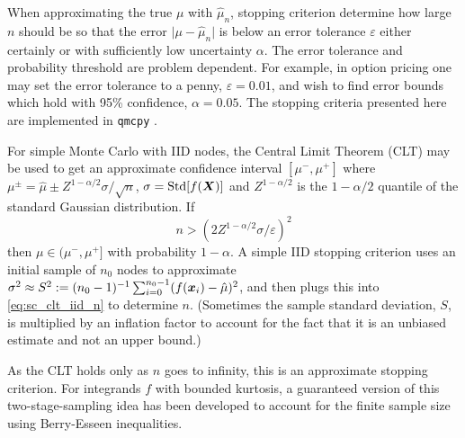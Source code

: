 \documentclass{svproc}
\begin{document}
When approximating the true $\mu$ with $\hat{\mu}_n$, stopping criterion determine how large $n$ should be so that the error $\lvert \mu - \hat{\mu}_n \rvert$ is below an error tolerance $\varepsilon$ either certainly or with sufficiently low uncertainty $\alpha$. The error tolerance and probability threshold are problem dependent. For example, in option pricing one may set the error tolerance to a penny, $\varepsilon=0.01$, and wish to find error bounds which hold with 95\% confidence, $\alpha=0.05$. The stopping criteria presented here are implemented in \texttt{qmcpy} \cite{QMCPy2020a}.

For simple Monte Carlo with IID nodes, the Central Limit Theorem (CLT) may be used to get an approximate confidence interval $[\mu^-,\mu^+]$ where $\mu^\pm = \hat{\mu} \pm Z^{1-\alpha/2} \sigma/\sqrt{n}$, $\sigma = \mathrm{Std}[f({\boldsymbol{X}})]$ and $Z^{1-\alpha/2}$ is the $1-\alpha/2$ quantile of the standard Gaussian distribution. If 
\begin{equation}
    n > (2 Z^{1-\alpha/2} \sigma/\varepsilon)^2
    \label{eq:sc_clt_iid_n}
\end{equation} then $\mu \in (\mu^-,\mu^+]$ with probability $1-\alpha$. A simple IID stopping criterion uses an initial sample of $n_0$ nodes to approximate $\sigma^2 \approx S^2 := (n_0-1)^{-1} \sum_{i=0}^{n_0-1}(f({\boldsymbol{x}}_i)-\hat{\mu})^2$, and then plugs this into \eqref{eq:sc_clt_iid_n} to determine $n$. (Sometimes the sample standard deviation, $S$, is multiplied by an inflation factor to account for the fact that it is an unbiased estimate and not an upper bound.) 

As the CLT holds only as $n$ goes to infinity, this is an approximate stopping criterion. For integrands $f$ with bounded kurtosis, a guaranteed version of this two-stage-sampling idea has been developed to account for the finite sample size using  Berry-Esseen inequalities\cite{HicEtal14a}. 
\end{document}

